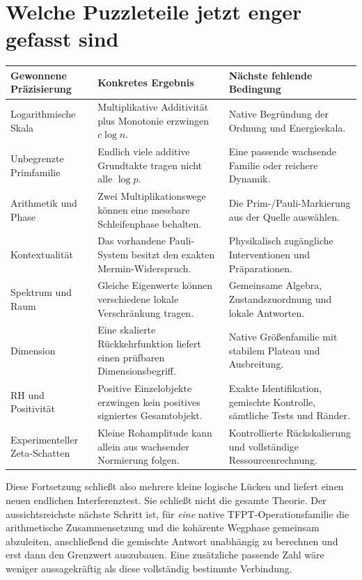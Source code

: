 \section{Welche Puzzleteile jetzt enger gefasst sind}
\begin{longtable}{L{37mm}L{60mm}L{51mm}}
\toprule\textbf{Gewonnene Präzisierung}&\textbf{Konkretes Ergebnis}&\textbf{Nächste fehlende Bedingung}\\\midrule\endhead
Logarithmische Skala&Multiplikative Additivität plus Monotonie erzwingen $c\log n$.&Native Begründung der Ordnung und Energieskala.\\
Unbegrenzte Primfamilie&Endlich viele additive Grundtakte tragen nicht alle $\log p$.&Eine passende wachsende Familie oder reichere Dynamik.\\
Arithmetik und Phase&Zwei Multiplikationswege können eine messbare Schleifenphase behalten.&Die Prim-/Pauli-Markierung aus der Quelle auswählen.\\
Kontextualität&Das vorhandene Pauli-System besitzt den exakten Mermin-Widerspruch.&Physikalisch zugängliche Interventionen und Präparationen.\\
Spektrum und Raum&Gleiche Eigenwerte können verschiedene lokale Verschränkung tragen.&Gemeinsame Algebra, Zustandszuordnung und lokale Antworten.\\
Dimension&Eine skalierte Rückkehrfunktion liefert einen prüfbaren Dimensionsbegriff.&Native Größenfamilie mit stabilem Plateau und Ausbreitung.\\
RH und Positivität&Positive Einzelobjekte erzwingen kein positives signiertes Gesamtobjekt.&Exakte Identifikation, gemischte Kontrolle, sämtliche Tests und Ränder.\\
Experimenteller Zeta-Schatten&Kleine Rohamplitude kann allein aus wachsender Normierung folgen.&Kontrollierte Rückskalierung und vollständige Ressourcenrechnung.\\\bottomrule
\end{longtable}

Diese Fortsetzung schließt also mehrere kleine logische Lücken und liefert einen neuen endlichen Interferenztest. Sie schließt nicht die gesamte Theorie. Der aussichtsreichste nächste Schritt ist, für \emph{eine} native TFPT-Operationsfamilie die arithmetische Zusammensetzung und die kohärente Wegphase gemeinsam abzuleiten, anschließend die gemischte Antwort unabhängig zu berechnen und erst dann den Grenzwert auszubauen. Eine zusätzliche passende Zahl wäre weniger aussagekräftig als diese vollständig bestimmte Verbindung.
